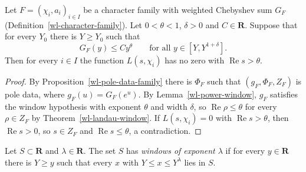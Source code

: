 \begin{theorem}\label{wl-zero-free-family}
Let $F=(\chi_i,a_i)_{i\in I}$ be a character family with weighted Chebyshev
sum $G_F$ (Definition~\ref{wl-character-family}). Let $0<\theta<1$,
$\delta>0$ and $C\in\mathbf R$. Suppose that for every $Y_0$ there is
$Y\geq Y_0$ such that
\[
 G_F(y)\leq Cy^\theta\qquad\text{for all }y\in[Y,Y^{1+\delta}].
\]
Then for every $i\in I$ the function $L(s,\chi_i)$ has no zero with
$\operatorname{Re}s>\theta$.
\end{theorem}
\begin{proof}
By Proposition~\ref{wl-pole-data-family} there is $\Phi_F$ such that
$(g_F,\Phi_F,Z_F)$ is pole data, where $g_F(u)=G_F(e^u)$. By
Lemma~\ref{wl-power-window}, $g_F$ satisfies the window hypothesis with
exponent $\theta$ and width $\delta$, so $\operatorname{Re}\rho\leq\theta$ for
every $\rho\in Z_F$ by Theorem~\ref{wl-landau-window}. If $L(s,\chi_i)=0$ with
$\operatorname{Re}s>\theta$, then $\operatorname{Re}s>0$, so $s\in Z_F$ and
$\operatorname{Re}s\leq\theta$, a contradiction.
\end{proof}

\begin{definition}\label{wl-windows}
Let $S\subset\mathbf R$ and $\lambda\in\mathbf R$. The set $S$ has
\emph{windows of exponent $\lambda$} if for every $y\in\mathbf R$ there is
$Y\geq y$ such that every $x$ with $Y\leq x\leq Y^\lambda$ lies in $S$.
\end{definition}

